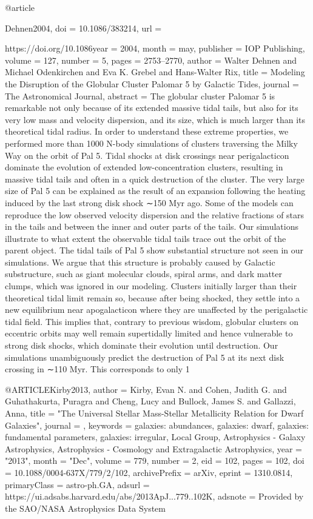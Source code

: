 \documentclass[apj]{emulateapj}
\begin{document}
{{{{{{{{{@article{Dehnen2004,
	doi = {10.1086/383214},
	url = {https://doi.org/10.1086year = 2004,
	month = {may},
	publisher = {{IOP} Publishing},
	volume = {127},
	number = {5},
	pages = {2753--2770},
	author = {Walter Dehnen and Michael Odenkirchen and Eva K. Grebel and Hans-Walter Rix},
	title = {Modeling the Disruption of the Globular Cluster Palomar 5 by Galactic Tides},
	journal = {The Astronomical Journal},
	abstract = {The globular cluster Palomar 5 is remarkable not only because of its extended massive tidal tails, but also for its very low mass and velocity dispersion, and its size, which is much larger than its theoretical tidal radius. In order to understand these extreme properties, we performed more than 1000 N-body simulations of clusters traversing the Milky Way on the orbit of Pal 5. Tidal shocks at disk crossings near perigalacticon dominate the evolution of extended low-concentration clusters, resulting in massive tidal tails and often in a quick destruction of the cluster. The very large size of Pal 5 can be explained as the result of an expansion following the heating induced by the last strong disk shock ∼150 Myr ago. Some of the models can reproduce the low observed velocity dispersion and the relative fractions of stars in the tails and between the inner and outer parts of the tails. Our simulations illustrate to what extent the observable tidal tails trace out the orbit of the parent object. The tidal tails of Pal 5 show substantial structure not seen in our simulations. We argue that this structure is probably caused by Galactic substructure, such as giant molecular clouds, spiral arms, and dark matter clumps, which was ignored in our modeling. Clusters initially larger than their theoretical tidal limit remain so, because after being shocked, they settle into a new equilibrium near apogalacticon where they are unaffected by the perigalactic tidal field. This implies that, contrary to previous wisdom, globular clusters on eccentric orbits may well remain supertidally limited and hence vulnerable to strong disk shocks, which dominate their evolution until destruction. Our simulations unambiguously predict the destruction of Pal 5 at its next disk crossing in ∼110 Myr. This corresponds to only 1}



@ARTICLE{Kirby2013,
       author = {{Kirby}, Evan N. and {Cohen}, Judith G. and {Guhathakurta}, Puragra and
         {Cheng}, Lucy and {Bullock}, James S. and {Gallazzi}, Anna},
        title = "{The Universal Stellar Mass-Stellar Metallicity Relation for Dwarf Galaxies}",
      journal = {\apj},
     keywords = {galaxies: abundances, galaxies: dwarf, galaxies: fundamental parameters, galaxies: irregular, Local Group, Astrophysics - Galaxy Astrophysics, Astrophysics - Cosmology and Extragalactic Astrophysics},
         year = "2013",
        month = "Dec",
       volume = {779},
       number = {2},
          eid = {102},
        pages = {102},
          doi = {10.1088/0004-637X/779/2/102},
archivePrefix = {arXiv},
       eprint = {1310.0814},
 primaryClass = {astro-ph.GA},
       adsurl = {https://ui.adsabs.harvard.edu/abs/2013ApJ...779..102K},
      adsnote = {Provided by the SAO/NASA Astrophysics Data System}
}




}}}}}}}}}}}
\end{document}
